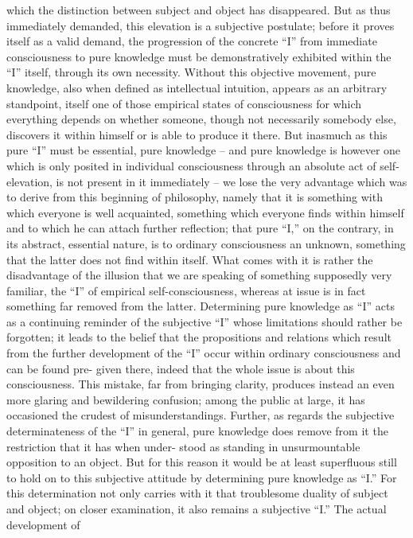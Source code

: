 which the distinction between subject and object has disappeared. But
as thus immediately demanded, this elevation is a subjective postulate;
before it proves itself as a valid demand, the progression of the concrete “I”
from immediate consciousness to pure knowledge must be demonstratively
exhibited within the “I” itself, through its own necessity. Without this
objective movement, pure knowledge, also when defined as intellectual
intuition, appears as an arbitrary standpoint, itself one of those empirical
states of consciousness for which everything depends on whether someone,
though not necessarily somebody else, discovers it within himself or is able
to produce it there. But inasmuch as this pure “I” must be essential, pure
knowledge – and pure knowledge is however one which is only posited in
individual consciousness through an absolute act of self-elevation, is not
present in it immediately – we lose the very advantage which was to derive
from this beginning of philosophy, namely that it is something with which
everyone is well acquainted, something which everyone finds within himself
and to which he can attach further reflection; that pure “I,” on the contrary,
in its abstract, essential nature, is to ordinary consciousness an unknown,
something that the latter does not find within itself. What comes with it is
rather the disadvantage of the illusion that we are speaking of something
supposedly very familiar, the “I” of empirical self-consciousness, whereas
at issue is in fact something far removed from the latter. Determining
pure knowledge as “I” acts as a continuing reminder of the subjective “I”
whose limitations should rather be forgotten; it leads to the belief that
the propositions and relations which result from the further development
of the “I” occur within ordinary consciousness and can be found pre-
given there, indeed that the whole issue is about this consciousness. This
mistake, far from bringing clarity, produces instead an even more glaring
and bewildering confusion; among the public at large, it has occasioned
the crudest of misunderstandings.
Further, as regards the subjective determinateness of the “I” in general,
pure knowledge does remove from it the restriction that it has when under-
stood as standing in unsurmountable opposition to an object. But for this
reason it would be at least superfluous still to hold on to this subjective
attitude by determining pure knowledge as “I.” For this determination not
only carries with it that troublesome duality of subject and object; on closer
examination, it also remains a subjective “I.” The actual development of
